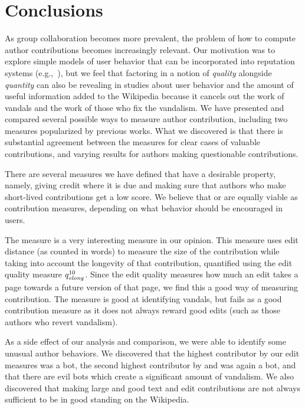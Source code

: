 \section{Conclusions}

As group collaboration becomes more prevalent,
the problem of how to compute author contributions
becomes increasingly relevant.
Our motivation was to explore simple models of user behavior
that can be incorporated into reputation
systems (e.g.,~\cite{Adler2007}),
but we feel that factoring in a notion
of \textit{quality} alongside \textit{quantity}
can also be revealing in studies about
user behavior and the amount of useful information
added to the Wikipedia because it cancels out
the work of vandals and the work of those who
fix the vandalism.
We have presented and compared several possible ways to
measure author contribution, including
two measures popularized by previous works.
What we discovered is that there is substantial
agreement between the measures for clear
cases of valuable contributions, and
varying results for authors making
questionable contributions.

There are several measures we have defined that
have a desirable property, namely, giving credit
where it is due and making sure that authors who make short-lived
contributions get a low score.
We believe that \textlong or \editlong are
equally viable as contribution measures, depending on what behavior
should be encouraged in users.

The \editlong measure is a very interesting measure
in our opinion.
This measure uses edit distance (as counted in words)
to measure the size of the contribution while taking into
account the longevity of that contribution, quantified
using the edit quality measure $\quality{elong}{10}{}$.
Since the edit quality measures how much an edit takes a
page towards a future version of that page, we find this
a good way of measuring contribution.
The \punish measure is good at identifying vandals,
but fails as a good contribution measure as it does not
always reward good edits (such as those authors who revert vandalism).

As a side effect of our analysis and comparison, we were
able to identify some unusual author behaviors.
We discovered that the highest contributor by our edit
measures was a bot, the second highest contributor by
\textlong and \punish was again a bot, and that there
are evil bots which create a significant amount of vandalism.
We also discovered that making large and good text and edit
contributions are not always sufficient to be in good
standing on the Wikipedia.


